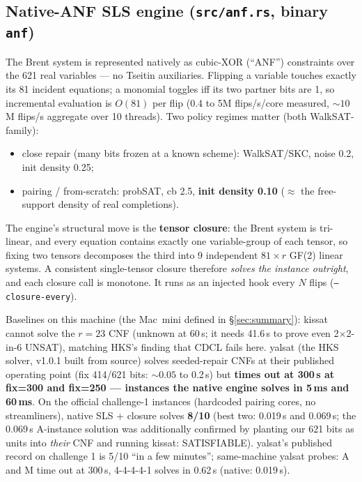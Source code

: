 \documentclass[10pt]{article}
\begin{document}
\subsection{Native-ANF SLS engine (\texttt{src/anf.rs}, binary
\texttt{anf})}\label{sec:engine}

The Brent system is represented natively as cubic-XOR (``ANF'')
constraints over the 621 real variables --- no Tseitin auxiliaries.
Flipping a variable touches exactly its 81 incident equations; a
monomial toggles iff its two partner bits are 1, so incremental
evaluation is $O(81)$ per flip (0.4 to 5M flips/s/core measured,
${\sim}10$M flips/s aggregate over 10 threads). Two policy regimes
matter (both WalkSAT-family):

\begin{itemize}
\item close repair (many bits frozen at a known scheme): WalkSAT/SKC,
  noise 0.2, init density 0.25;
\item pairing / from-scratch: probSAT, cb 2.5, \textbf{init density
  0.10} ($\approx$ the free-support density of real completions).
\end{itemize}

The engine's structural move is the \textbf{tensor closure}: the Brent
system is tri-linear, and every equation contains exactly one
variable-group of each tensor, so fixing two tensors decomposes the
third into 9 independent $81\times r$ GF(2) linear systems. A
consistent single-tensor closure therefore \emph{solves the instance
outright}, and each closure call is monotone. It runs as an injected
hook every $N$ flips (\texttt{--closure-every}).

Baselines on this machine (the Mac~mini defined in
\S\ref{sec:summary}): kissat cannot solve the $r{=}23$ CNF (unknown at
60\,s; it needs 41.6\,s to prove even 2$\times$2-in-6 UNSAT), matching
HKS's finding that CDCL fails here. yalsat (the HKS solver, v1.0.1
built from source) solves seeded-repair CNFs at their published
operating point (fix 414/621 bits: ${\sim}0.05$ to 0.2\,s) but
\textbf{times out at 300\,s at fix=300 and fix=250 --- instances the
native engine solves in 5\,ms and 60\,ms}. On the official challenge-1
instances (hardcoded pairing cores, no streamliners), native SLS +
closure solves \textbf{8/10} (best two: 0.019\,s and 0.069\,s; the
0.069\,s A-instance solution was additionally confirmed by planting
our 621 bits as units into \emph{their} CNF and running kissat:
SATISFIABLE). yalsat's published record on challenge 1 is 5/10 ``in a
few minutes''; same-machine yalsat probes: A and M time out at 300\,s,
4-4-4-4-1 solves in 0.62\,s (native: 0.019\,s).
\end{document}
